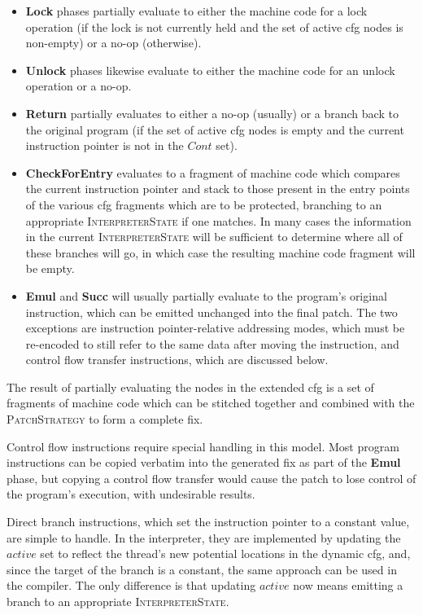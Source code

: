 \begin{itemize}
\item \textbf{Lock} phases partially evaluate to either the machine
  code for a lock operation (if the lock is not currently held and the
  set of active \gls{cfg} nodes is non-empty) or a no-op (otherwise).

\item \textbf{Unlock} phases likewise evaluate to either the machine
  code for an unlock operation or a no-op.
\item \textbf{Return} partially evaluates to either a no-op (usually)
  or a branch back to the original program (if the set of active
  \gls{cfg} nodes is empty and the current instruction pointer is not
  in the $\mathit{Cont}$ set).

\item \textbf{CheckForEntry} evaluates to a fragment of machine code
  which compares the current instruction pointer and stack to those
  present in the entry points of the various \gls{cfg} fragments which
  are to be protected, branching to an appropriate
  \textsc{InterpreterState} if one matches.  In many cases the
  information in the current \textsc{InterpreterState} will be
  sufficient to determine where all of these branches will go, in
  which case the resulting machine code fragment will be empty.

\item \textbf{Emul} and \textbf{Succ} will usually partially evaluate
  to the program's original instruction, which can be emitted
  unchanged into the final patch.  The two exceptions are instruction
  pointer-relative addressing modes, which must be re-encoded to still
  refer to the same data after moving the instruction, and control
  flow transfer instructions, which are discussed below.
\end{itemize}
The result of partially evaluating the nodes in the extended \gls{cfg}
is a set of fragments of machine code which can be stitched together
and combined with the \textsc{PatchStrategy} to form a complete fix.

Control flow instructions require special handling in this model.
Most program instructions can be copied verbatim into the generated
fix as part of the \textbf{Emul} phase, but copying a control flow
transfer would cause the patch to lose control of the program's
execution, with undesirable results.

Direct branch instructions, which set the instruction pointer to a
constant value, are simple to handle.  In the interpreter, they are
implemented by updating the $\mathit{active}$ set to reflect the
thread's new potential locations in the dynamic \gls{cfg}, and, since
the target of the branch is a constant, the same approach can be used
in the compiler.  The only difference is that updating
$\mathit{active}$ now means emitting a branch to an appropriate
\textsc{InterpreterState}.

